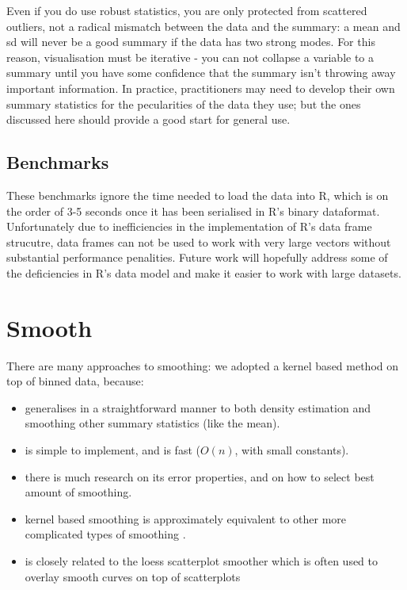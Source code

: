 \documentclass[journal]{vgtc}                %
\begin{document}
Even if you do use robust statistics, you are only protected from scattered outliers, not a radical mismatch between the data and the summary: a mean and sd will never be a good summary if the data has two strong modes. For this reason, visualisation must be iterative - you can not collapse a variable to a summary until you have some confidence that the summary isn't throwing away important information. In practice, practitioners may need to develop their own summary statistics for the pecularities of the data they use; but the ones discussed here should provide a good start for general use.

\subsection{Benchmarks}

These benchmarks ignore the time needed to load the data into R, which is on the order of 3-5 seconds once it has been serialised in R's binary dataformat.  Unfortunately due to inefficiencies in the implementation of R's data frame strucutre, data frames can not be used to work with very large vectors without substantial performance penalities. Future work will hopefully address some of the deficiencies in R's data model and make it easier to work with large datasets.

\section{Smooth}
\label{sec:smooth}


There are many approaches to smoothing: we adopted a kernel based method on top of binned data, because:

\begin{itemize}
  \item generalises in a straightforward manner to both density estimation and smoothing other summary statistics (like the mean).

  \item is simple to implement, and is fast ($O(n)$, with small constants).
  
  \item there is much research on its error properties, and on how to select best amount of smoothing.
  
  \item kernel based smoothing is approximately equivalent to other more complicated types of smoothing \citep{silverman:1984}.
  
  \item is closely related to the {\sc loess} scatterplot smoother \citep{cleveland:1979} which is often used to overlay smooth curves on top of scatterplots

\end{itemize}
\end{document}

